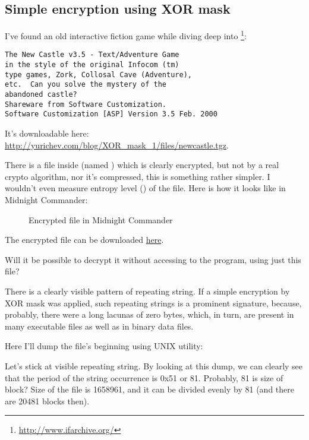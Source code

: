 \subsection{Simple encryption using XOR mask}
\label{XOR_mask_1}

I've found an old interactive fiction game while diving deep into \footnote{\url{http://www.ifarchive.org/}}:

\begin{lstlisting}
The New Castle v3.5 - Text/Adventure Game
in the style of the original Infocom (tm)
type games, Zork, Collosal Cave (Adventure),
etc.  Can you solve the mystery of the
abandoned castle?
Shareware from Software Customization.
Software Customization [ASP] Version 3.5 Feb. 2000
\end{lstlisting}

It's downloadable here: \url{http://yurichev.com/blog/XOR_mask_1/files/newcastle.tgz}.

There is a file inside (named ) which is clearly encrypted, but not by a real crypto algorithm, nor it's compressed, this is something rather simpler.
I wouldn't even measure entropy level () of the file.
Here is how it looks like in Midnight Commander:

\begin{figure}[H]
\centering
{}
\caption{Encrypted file in Midnight Commander}
\end{figure}

The encrypted file can be downloaded \href{http://yurichev.com/blog/XOR_mask_1/files/castle.dbf}{here}.

Will it be possible to decrypt it without accessing to the program, using just this file?

There is a clearly visible pattern of repeating string.
If a simple encryption by XOR mask was applied, such repeating strings is a prominent signature, because, probably, there were a long lacunas of zero bytes,
which, in turn, are present in many executable files as well as in binary data files.

Here I'll dump the file's beginning using  UNIX utility:



Let's stick at visible repeating  string.
By looking at this dump, we can clearly see that the period of the string occurrence is 0x51 or 81.
Probably, 81 is size of block?
Size of the file is 1658961, and it can be divided evenly by 81 (and there are 20481 blocks then).

